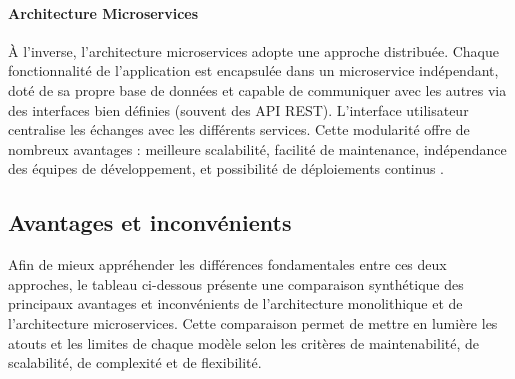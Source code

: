 \paragraph*{Architecture Microservices}
À l'inverse, l'architecture microservices adopte une approche distribuée. Chaque fonctionnalité de l'application est encapsulée dans un microservice indépendant, doté de sa propre base de données et capable de communiquer avec les autres via des interfaces bien définies (souvent des API REST). L'interface utilisateur centralise les échanges avec les différents services. Cette modularité offre de nombreux avantages : meilleure scalabilité, facilité de maintenance, indépendance des équipes de développement, et possibilité de déploiements continus \cite{martin-fowler-microservices}.

\vspace{0.5cm}

\subsection{Avantages et inconvénients}
Afin de mieux appréhender les différences fondamentales entre ces deux approches, le tableau ci-dessous présente une comparaison synthétique des principaux avantages et inconvénients de l'architecture monolithique et de l'architecture microservices. Cette comparaison permet de mettre en lumière les atouts et les limites de chaque modèle selon les critères de maintenabilité, de scalabilité, de complexité et de flexibilité.

